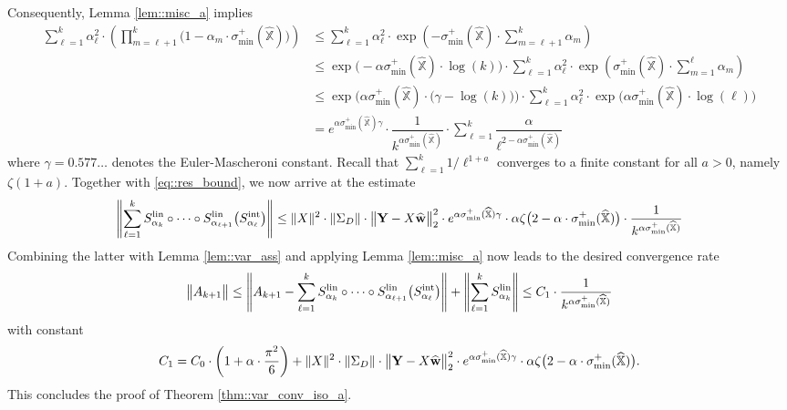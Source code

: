 \documentclass{article}
\newcommand*{\bbX}{\mathbb{X}}
\newcommand*{\bfY}{\mathbf{Y}}
\newcommand*{\bfw}{\mathbf{w}}
\newcommand*{\sigminp}{\sigma_{\mathrm{min}}^+}
\DeclarePairedDelimiter{\norm}{\lVert}{\rVert}
\newcommand{\whweight}{\widehat{\bfw}}
\newcommand{\whbbX}{\widehat{\bbX}}
\newcommand{\Slin}{S^{\mathrm{lin}}}
\newcommand{\Sint}{S^{\mathrm{int}}}
\begin{document}
Consequently, Lemma \ref{lem::misc_a} implies \begin{align*}
  \sum_{\ell = 1}^k \alpha_\ell^2 \cdot \left(\prod_{m = \ell + 1}^k \big(1 -
  \alpha_m \cdot \sigminp(\whbbX)\big)\right) &\leq \sum_{\ell = 1}^k
  \alpha_\ell^2 \cdot \exp \left(- \sigminp(\whbbX) \cdot \sum_{m = \ell + 1}^k
  \alpha_m\right)\\
  &\leq \exp\Big(- \alpha \sigminp(\whbbX) \cdot \log(k)\Big)
  \cdot \sum_{\ell = 1}^{k} \alpha_\ell^2 \cdot \exp \left(\sigminp(\whbbX)
  \cdot \sum_{m = 1}^{\ell} \alpha_m\right)\\
  &\leq \exp\Big(\alpha \sigminp(\whbbX) \cdot \big(\gamma - \log(k)\big)\Big)
  \cdot \sum_{\ell = 1}^k \alpha_\ell^2 \cdot \exp\Big(\alpha \sigminp(\whbbX)
  \cdot \log(\ell)\Big)\\
  &= e^{\alpha \sigminp(\whbbX) \gamma} \cdot \dfrac{1}{k^{\alpha
  \sigminp(\whbbX)}} \cdot \sum_{\ell = 1}^k \dfrac{\alpha}{\ell^{2 - \alpha
  \sigminp(\whbbX)}}
\end{align*} where $\gamma = 0.577 \ldots$ denotes the Euler-Mascheroni
constant. Recall that $\sum_{\ell = 1}^{k} 1 / \ell^{1 + a}$ converges to a
finite constant for all $a > 0$, namely $\zeta(1 + a)$. Together with
\eqref{eq::res_bound}, we now arrive at the estimate \begin{align*}
  \norm*{\sum_{\ell = 1}^k \Slin_{\alpha_k} \circ \cdots \circ
  \Slin_{\alpha_{\ell + 1}} \big(\Sint_{\alpha_\ell}\big)} \leq \norm{X}^2 \cdot
  \norm{\Sigma_D} \cdot \norm[\big]{\bfY - X \whweight}_2^2 \cdot e^{\alpha
  \sigminp(\whbbX) \gamma} \cdot \alpha \zeta\big(2 - \alpha \cdot
  \sigminp(\whbbX)\big) \cdot \dfrac{1}{k^{\alpha \sigminp(\whbbX)}}
\end{align*} Combining the latter with Lemma \ref{lem::var_ass} and applying
Lemma \ref{lem::misc_a} now leads to the desired convergence rate \begin{align*}
  \norm[\big]{A_{k + 1}} \leq \norm[\Bigg]{A_{k + 1} - \sum_{\ell = 1}^k
  \Slin_{\alpha_k} \circ \cdots \circ \Slin_{\alpha_{\ell + 1}}
  \big(\Sint_{\alpha_\ell}\big)} + \norm*{\sum_{\ell = 1}^k \Slin_{\alpha_k}}
  \leq C_1 \cdot \dfrac{1}{k^{\alpha \sigminp(\whbbX)}}
\end{align*} with constant \begin{align*}
  C_1 = C_0 \cdot \left(1 + \alpha \cdot \dfrac{\pi^2}{6}\right)+ \norm{X}^2
  \cdot \norm{\Sigma_D} \cdot \norm[\big]{\bfY - X \whweight}_2^2 \cdot
  e^{\alpha \sigminp(\whbbX) \gamma} \cdot \alpha \zeta\big(2 - \alpha \cdot
  \sigminp(\whbbX)\big).
\end{align*} This concludes the proof of Theorem \ref{thm::var_conv_iso_a}.
\end{document}
